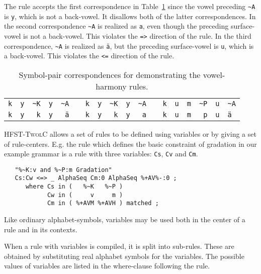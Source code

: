 \documentclass[a4paper]{article}
\begin{document}
The rule accepts the first correspondence in Table~\ref{cor:1} since
the vowel preceding \verb|~A| is \verb|y|, which is not a
back-vowel. It disallows both of the latter correspondences. In the
second correspondence \verb|~A| is realized as \verb|a|, even though
the preceding surface-vowel is not a back-vowel. This violates the
\verb|=>| direction of the rule. In the third correspondence,
\verb|~A| is realized as \texttt{\"a}, but the preceding
surface-vowel is \verb|u|, which is a back-vowel. This violates the
\verb|<=| direction of the rule.

\begin{table}
  \begin{center}
    \begin{tabular}{|rrrrr|rrrrr|rrrrrr|}
      \hline

      \verb|k| & \verb|y| & \verb|~K| & \verb|y| & \verb|~A | &
      \verb| k| & \verb|y| & \verb|~K| & \verb|y| & \verb|~A | &
      \verb| k| & \verb|u| & \verb|m| & \verb|~P| & \verb|u| &
      \verb|~A|\\

      \verb|k| & \verb|y| & \verb|k| & \verb|y| & \texttt{\"a}\verb| |
      & \verb| k| & \verb|y| & \verb|k| & \verb|y| & \verb|a | &
      \verb| k| & \verb|u| & \verb|m| & \verb|p| & \verb|u| &
      \texttt{\"a}\verb| |\\

      \hline
    \end{tabular}
  \end{center}
  \caption{Symbol-pair correspondences for demonstrating the
  vowel-harmony rules.}\label{cor:1}
\end{table}

\textsc{HFST-TwolC} allows a set of rules to be defined using
variables or by giving a set of rule-centers. E.g. the rule which
defines the basic constraint of gradation in our example grammar is a
rule with three variables: \verb|Cs|, \verb|Cv| and \verb|Cm|.
\begin{verbatim}
   "%~K:v and %~P:m Gradation"
   Cs:Cw <=> _ AlphaSeq Cm:0 AlphaSeq %+AV%-:0 ;
      where Cs in (   %~K   %~P )
            Cw in (     v     m )
            Cm in ( %+AVM %+AVH ) matched ;
\end{verbatim}
Like ordinary alphabet-symbols, variables may be used both in the
center of a rule and in its contexts.
 
When a rule with variables is compiled, it is split into
sub-rules. These are obtained by substituting real alphabet symbols
for the variables. The possible values of variables are listed in the
where-clause following the rule.
\end{document}
